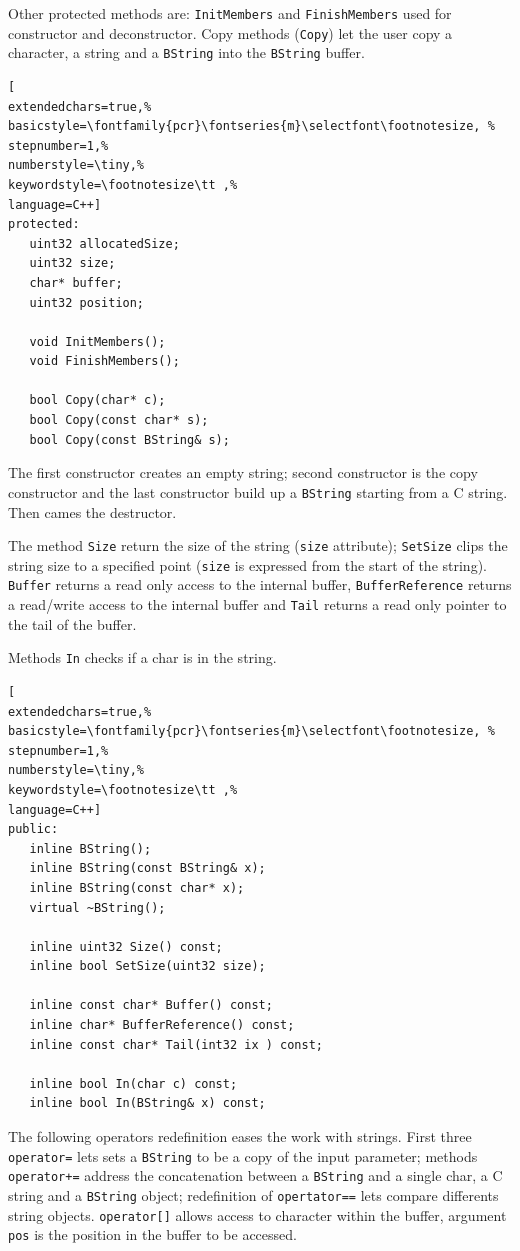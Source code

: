 Other protected methods are: \texttt{InitMembers} and \texttt{FinishMembers} used for constructor and deconstructor.
Copy methods (\texttt{Copy}) let the user copy a character, a string and a \texttt{BString} into the \texttt{BString} buffer.

\begin{lstlisting}[
extendedchars=true,%
basicstyle=\fontfamily{pcr}\fontseries{m}\selectfont\footnotesize, %
stepnumber=1,%
numberstyle=\tiny,%
keywordstyle=\footnotesize\tt ,%
language=C++]
protected:
   uint32 allocatedSize;
   uint32 size;
   char* buffer;
   uint32 position;

   void InitMembers();
   void FinishMembers();

   bool Copy(char* c);
   bool Copy(const char* s);
   bool Copy(const BString& s);
\end{lstlisting}

The first constructor creates an empty string; second constructor is the copy constructor and the last constructor build up a \texttt{BString} starting from a C string. Then cames the destructor.

The method \texttt{Size} return the size of the string (\texttt{size} attribute); \texttt{SetSize} clips the string size to a specified point (\texttt{size} is expressed from the start of the string). \texttt{Buffer} returns a read only access to the internal buffer, \texttt{BufferReference} returns a read/write access to the internal buffer and \texttt{Tail} returns a read only pointer to the tail of the buffer.

Methods \texttt{In} checks if a char is in the string.

\begin{lstlisting}[
extendedchars=true,%
basicstyle=\fontfamily{pcr}\fontseries{m}\selectfont\footnotesize, %
stepnumber=1,%
numberstyle=\tiny,%
keywordstyle=\footnotesize\tt ,%
language=C++]
public:
   inline BString();
   inline BString(const BString& x);
   inline BString(const char* x);
   virtual ~BString();

   inline uint32 Size() const;
   inline bool SetSize(uint32 size);

   inline const char* Buffer() const;
   inline char* BufferReference() const;
   inline const char* Tail(int32 ix ) const;

   inline bool In(char c) const;
   inline bool In(BString& x) const;
\end{lstlisting}

The following operators redefinition eases the work with strings. First three \texttt{operator=} lets sets a \texttt{BString} to be a copy of the input parameter; methods \texttt{operator+=} address the concatenation between a \texttt{BString} and a single char, a C string and a \texttt{BString} object; redefinition of \texttt{opertator==} lets compare differents string objects. \texttt{operator[]} allows access to character within the buffer, argument \texttt{pos} is the position in the buffer to be accessed.

